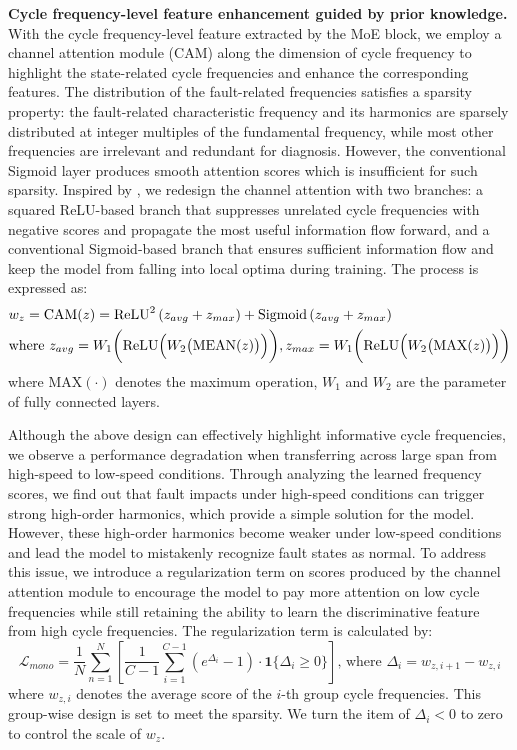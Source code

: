 \documentclass{article}
\begin{document}
	\textbf{Cycle frequency-level feature enhancement guided by prior knowledge.} With the cycle frequency-level feature extracted by the MoE block, we employ a channel attention module (CAM) along the dimension of cycle frequency to highlight the state-related cycle frequencies and enhance the corresponding features. The distribution of the fault-related frequencies satisfies a sparsity property: the fault-related characteristic frequency and its harmonics are sparsely distributed at integer multiples of the fundamental frequency, while most other frequencies are irrelevant and redundant for diagnosis. However, the conventional Sigmoid layer produces smooth attention scores which is insufficient for such sparsity. Inspired by \cite{10657913}, we redesign the channel attention with two branches: a squared ReLU-based branch that suppresses unrelated cycle frequencies with negative scores and propagate the most useful information flow forward, and a conventional Sigmoid-based branch that ensures sufficient information flow and keep the model from falling into local optima during training. The process is expressed as:
	\begin{equation}
		\begin{aligned}
			& w_{z} = \mathrm{CAM}(z) = \mathrm{ReLU}^{2} \left(z_{avg} + z_{max}\right) + \mathrm{Sigmoid} \left(z_{avg} + z_{max}\right) \\
			& \text{where } z_{avg} = W_{1} \biggl( \mathrm{ReLU} \Bigl( W_{2} \bigl( \mathrm{MEAN}(z) \bigr) \Bigr) \biggr), z_{max} = W_{1} \biggl( \mathrm{ReLU} \Bigl( W_{2} \bigl( \mathrm{MAX}(z) \bigr) \Bigr) \biggr)
		\end{aligned}
	\end{equation}
	where $\mathrm{MAX}(\cdot)$ denotes the maximum operation, $W_{1}$ and $W_{2}$ are the parameter of fully connected layers.
	
	Although the above design can effectively highlight informative cycle frequencies, we observe a performance degradation when transferring across large span from high-speed to low-speed conditions. Through analyzing the learned frequency scores, we find out that fault impacts under high-speed conditions can trigger strong high-order harmonics, which provide a simple solution for the model. However, these high-order harmonics become weaker under low-speed conditions and lead the model to mistakenly recognize fault states as normal. To address this issue, we introduce a regularization term on scores produced by the channel attention module to encourage the model to pay more attention on low cycle frequencies while still retaining the ability to learn the discriminative feature from high cycle frequencies. The regularization term is calculated by:
	\begin{equation}
		\mathcal{L}_{mono} = \frac{1}{N}\sum_{n=1}^{N}\left[\frac{1}{C-1}\sum_{i=1}^{C-1} \left(e^{\Delta_{i}} - 1\right) \cdot \mathbf{1}\{\Delta_{i}\geq 0\} \right]
		\text{, where } \Delta_{i} = w_{z, i+1} - w_{z, i}
		\label{loss_mono}
	\end{equation}
	where $w_{z, i}$ denotes the average score of the $i$-th group cycle frequencies. This group-wise design is set to meet the sparsity. We turn the item of $\Delta_{i}<0$ to zero to control the scale of $w_{z}$.
	
\end{document}
